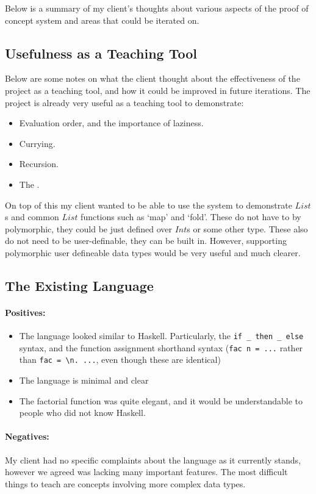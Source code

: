 \noindent Below is a summary of my client's thoughts about various aspects of the proof of concept system and areas that could be iterated on.

\subsection{Usefulness as a Teaching Tool}
Below are some notes on what the client thought about the effectiveness of the project as a teaching tool, and how it could be improved in future iterations.
The project is already very useful as a teaching tool to demonstrate:
\begin{itemize}
    \item Evaluation order, and the importance of laziness.
    \item Currying.
    \item Recursion.
    \item The \lcalc.
\end{itemize}

\noindent On top of this my client wanted to be able to use the system to demonstrate $List$s and common $List$ functions such as `map' and `fold'. These do not have to by polymorphic, they could be just defined over $Int$s or some other type. These also do not need to be user-definable, they can be built in. However, supporting polymorphic user defineable data types would be very useful and much clearer. 

\subsection{The Existing Language}
\paragraph{Positives:}
\begin{itemize}
    \item The language looked similar to Haskell. Particularly, the \verb|if _ then _ else| syntax, and the function assignment shorthand syntax (\verb|fac n = ...| rather than \verb|fac = \n. ...|, even though these are identical)
    \item The language is minimal and clear
    \item The factorial function was quite elegant, and it would be understandable to people who did not know Haskell.  
\end{itemize}

\paragraph{Negatives:}
My client had no specific complaints about the language as it currently stands, however we agreed was lacking many important features. The most difficult things to teach are concepts involving more complex data types. 


